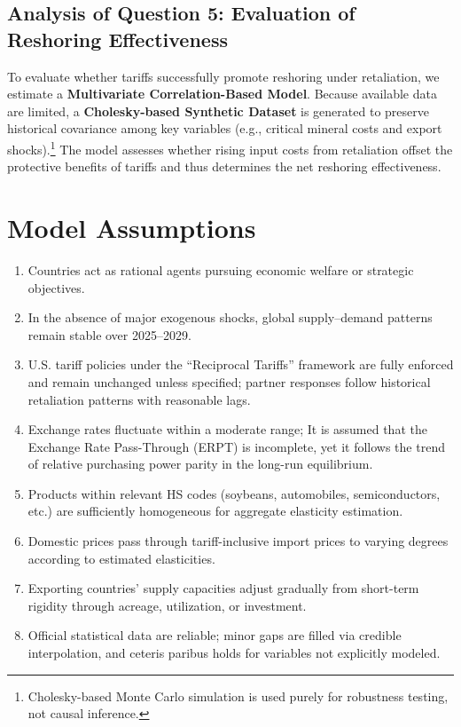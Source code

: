 \documentclass{apmcmthesis}
\begin{document}
\subsection{Analysis of Question 5: Evaluation of Reshoring Effectiveness}
To evaluate whether tariffs successfully promote reshoring under retaliation, we estimate a 
\textbf{Multivariate Correlation-Based Model}. Because available data are limited, a 
\textbf{Cholesky-based Synthetic Dataset} is generated to preserve historical covariance among key 
variables (e.g., critical mineral costs and export shocks).\footnote{Cholesky-based Monte Carlo 
simulation is used purely for robustness testing, not causal inference.} 
The model assesses whether rising input costs from retaliation offset the protective benefits of 
tariffs and thus determines the net reshoring effectiveness.


\section{Model Assumptions}
\begin{enumerate}
    \item Countries act as rational agents pursuing economic welfare or strategic objectives.
    \item In the absence of major exogenous shocks, global supply–demand patterns remain stable over 2025--2029.
    \item U.S. tariff policies under the ``Reciprocal Tariffs'' framework are fully enforced and remain unchanged unless specified; partner responses follow historical retaliation patterns with reasonable lags.
    \item Exchange rates fluctuate within a moderate range; It is assumed that the Exchange Rate Pass-Through (ERPT) is incomplete, yet it follows the trend of relative purchasing power parity in the long-run equilibrium.
    \item Products within relevant HS codes (soybeans, automobiles, semiconductors, etc.) are sufficiently homogeneous for aggregate elasticity estimation.
    \item Domestic prices pass through tariff-inclusive import prices to varying degrees according to estimated elasticities.
    \item Exporting countries’ supply capacities adjust gradually from short-term rigidity through acreage, utilization, or investment.
    \item Official statistical data are reliable; minor gaps are filled via credible interpolation, and ceteris paribus holds for variables not explicitly modeled.
\end{enumerate}
\end{document}

